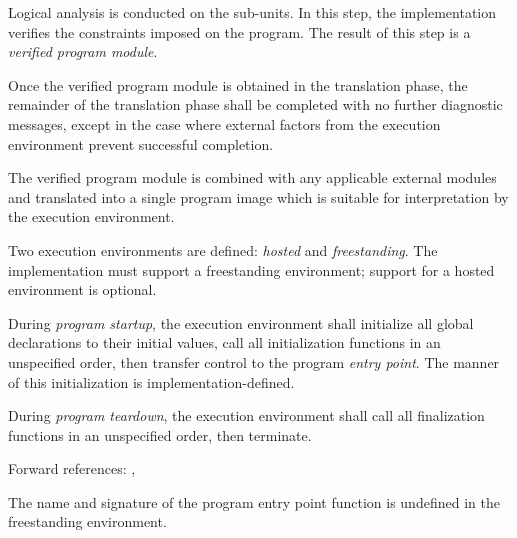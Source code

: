 \specsubitem
Logical analysis is conducted on the sub-units. In this step, the implementation
verifies the constraints imposed on the program. The result of this step is a
\textit{verified program module}.


\specsubitem
Once the verified program module is obtained in the translation phase, the
remainder of the translation phase shall be completed with no further
diagnostic messages, except in the case where external factors from the
execution environment prevent successful completion.


\specsubitem
The verified program module is combined with any applicable external modules and
translated into a single program image which is suitable for interpretation by
the execution environment.


\specsubitem
Two execution environments are defined: \textit{hosted} and
\textit{freestanding}. The implementation must support a freestanding
environment; support for a hosted environment is optional.

\specsubitem
During \textit{program startup}, the execution environment shall initialize all
global declarations to their initial values, call all initialization functions
in an unspecified order, then transfer control to the program \textit{entry
point}. The manner of this initialization is implementation-defined.


\specsubitem
During \textit{program teardown}, the execution environment shall call all
finalization functions in an unspecified order, then terminate.

Forward references: , 


\specsubsubitem
The name and signature of the program entry point function is undefined in the
freestanding environment.

